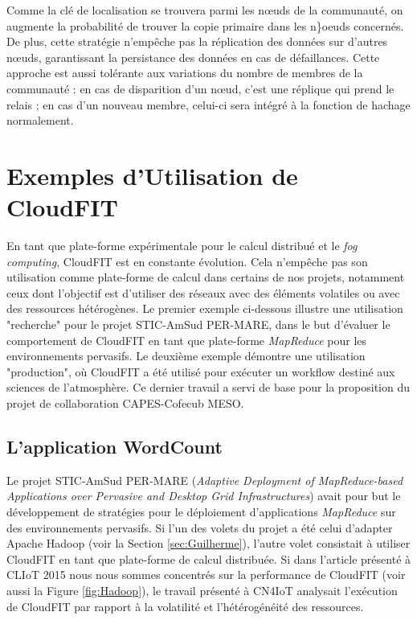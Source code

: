Comme la clé de localisation se trouvera parmi les n{\oe}uds de la communauté, on augmente la probabilité de trouver la copie primaire dans les n{\}oe}uds concernés. De plus, cette stratégie n'empêche pas la réplication des données sur d'autres n{\oe}uds, garantissant la persistance des données en cas de défaillances. Cette approche est aussi tolérante aux variations du nombre de membres de la communauté : en cas de disparition d'un n{\oe}ud, c'est une réplique qui prend le relais ; en cas d'un nouveau membre, celui-ci sera intégré à la fonction de hachage normalement.   

\section{Exemples d'Utilisation de CloudFIT}

En tant que plate-forme expérimentale pour le calcul distribué et le \textit{fog computing}, CloudFIT est en constante évolution. Cela n'empêche pas son utilisation comme plate-forme de calcul dans certains de nos projets, notamment ceux dont l'objectif est d'utiliser des réseaux avec des éléments volatiles ou avec des ressources hétérogènes. Le premier exemple ci-dessous illustre une utilisation "recherche" pour le projet STIC-AmSud PER-MARE, dans le but d'évaluer le comportement de CloudFIT en tant que plate-forme \textit{MapReduce} pour les environnements pervasifs. Le deuxième exemple démontre une utilisation "production", où CloudFIT a été utilisé pour exécuter un workflow destiné aux sciences de l'atmosphère. Ce dernier travail a servi de base  pour la proposition du projet de collaboration CAPES-Cofecub MESO. 


\subsection{L'application WordCount}

Le projet STIC-AmSud PER-MARE (\textit{Adaptive Deployment of MapReduce-based Applications over Pervasive and Desktop Grid Infrastructures}) avait pour but le développement de stratégies pour le déploiement d'applications \textit{MapReduce} sur des environnements pervasifs. Si l'un des volets du projet a été celui d'adapter Apache Hadoop (voir la Section \ref{sec:Guilherme}), l'autre volet consistait à utiliser CloudFIT en tant que plate-forme de calcul distribuée. Si dans l'article présenté à CLIoT 2015 \cite{Steffenel15Taormina} nous nous sommes concentrés sur la performance de CloudFIT (voir aussi la Figure \ref{fig:Hadoop}), le travail présenté à CN4IoT \cite{Steffenel2015Roma} analysait l'exécution de CloudFIT par rapport à la volatilité et l'hétérogénéité des ressources.

